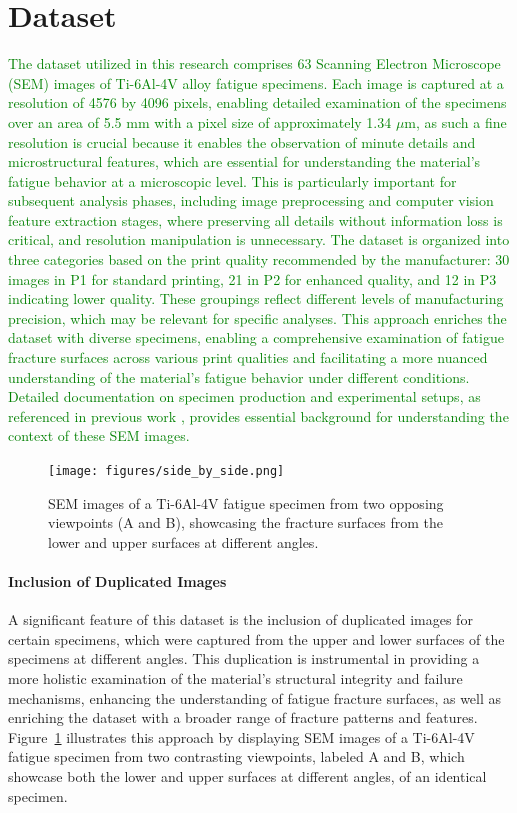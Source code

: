\documentclass[preprint,12pt]{elsarticle}
\begin{document}
\section{Dataset} \label{Sec:dataset}

\textcolor{green}{The dataset utilized in this research comprises 63 Scanning Electron Microscope (SEM) images of Ti-6Al-4V alloy fatigue specimens. Each image is captured at a resolution of 4576 by 4096 pixels, enabling detailed examination of the specimens over an area of 5.5 mm with a pixel size of approximately 1.34 $\mu$m, as such a fine resolution is crucial because it enables the observation of minute details and microstructural features, which are essential for understanding the material’s fatigue behavior at a microscopic level.
This is particularly important for subsequent analysis phases, including image preprocessing and computer vision feature extraction stages, where preserving all details without information loss is critical, and resolution manipulation is unnecessary.
The dataset is organized into three categories based on the print quality recommended by the manufacturer: 30 images in P1 for standard printing, 21 in P2 for enhanced quality, and 12 in P3 indicating lower quality. These groupings reflect different levels of manufacturing precision, which may be relevant for specific analyses.
This approach enriches the dataset with diverse specimens, enabling a comprehensive examination of fatigue fracture surfaces across various print qualities and facilitating a more nuanced understanding of the material's fatigue behavior under different conditions.
Detailed documentation on specimen production and experimental setups, as referenced in previous work \cite{navickaite2022efficient}, provides essential background for understanding the context of these SEM images.}


\begin{figure}[h!]
  \centering
  \texttt{[image: figures/side\_by\_side.png]}
  \caption{SEM images of a Ti-6Al-4V fatigue specimen from two opposing viewpoints (A and B), showcasing the fracture surfaces from the lower and upper surfaces at different angles.}
  \label{same_material_from_both_sides}
\end{figure}

\paragraph{Inclusion of Duplicated Images}
A significant feature of this dataset is the inclusion of duplicated images for certain specimens, which were captured from the upper and lower surfaces of the specimens at different angles. This duplication is instrumental in providing a more holistic examination of the material's structural integrity and failure mechanisms, enhancing the understanding of fatigue fracture surfaces, as well as enriching the dataset with a broader range of fracture patterns and features.  Figure~\ref{same_material_from_both_sides} illustrates this approach by displaying SEM images of a Ti-6Al-4V fatigue specimen from two contrasting viewpoints, labeled A and B, which showcase both the lower and upper surfaces at different angles, of an identical specimen.
\end{document}
